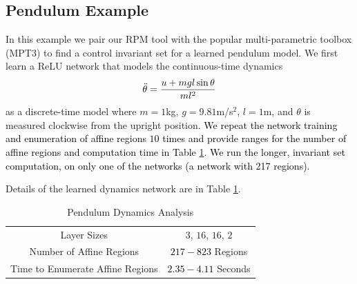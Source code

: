 \subsection{Pendulum Example} \label{Pendulum}
In this example we pair our RPM tool with the popular multi-parametric toolbox (MPT3) \cite{MPT3} to find a control invariant set for a learned pendulum model. We first learn a ReLU network that models the continuous-time dynamics
\begin{align}
    \Ddot{\theta} = \frac{u + mgl\sin{\theta}}{ml^2}
\end{align}
as a discrete-time model where $m = 1$kg, $g = 9.81$m/s$^{2}$, $l=1$m, and $\theta$ is measured clockwise from the upright position. 
\textcolor{black}{We repeat the network training and enumeration of affine regions $10$ times and provide ranges for the number of affine regions and computation time in Table \ref{tab:pend_details}.
We run the longer, invariant set computation, on only one of the networks (a network with 217 regions).}

Details of the learned dynamics network are in Table \ref{tab:pend_details}.


\begingroup
\setlength{\tabcolsep}{5pt}
\begin{table}[h]
    \centering
    \caption{Pendulum Dynamics Analysis}
    {\color{black}\begin{tabular}{c | c}
        Layer Sizes & $3$, $16$, $16$, $2$ \\
        Number of Affine Regions & \textcolor{black}{$217 - 823$} Regions \\
        Time to Enumerate Affine Regions & \textcolor{black}{$2.35 - 4.11$} Seconds
    \end{tabular}}
    \label{tab:pend_details}
\end{table} 
\endgroup




